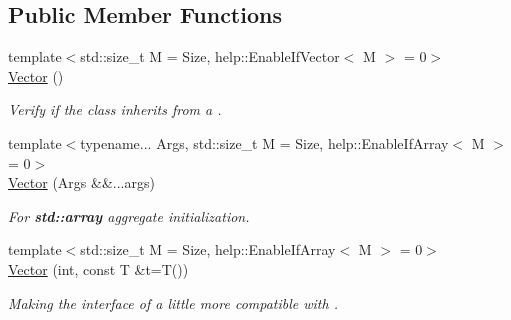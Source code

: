 \subsection*{Public Member Functions}
\begin{DoxyCompactItemize}
\item 
{\footnotesize template$<$std\+::size\+\_\+t M = Size, help\+::\+Enable\+If\+Vector$<$ M $>$  = 0$>$ }\\\hyperlink{structcnt_1_1Vector_aff96e6f41a0a86337921fdf3defd6c3b}{Vector} ()
\begin{DoxyCompactList}\small\item\em Verify if the class inherits from a \textquotesingle{}. \end{DoxyCompactList}\item 
{\footnotesize template$<$typename... Args, std\+::size\+\_\+t M = Size, help\+::\+Enable\+If\+Array$<$ M $>$  = 0$>$ }\\\hyperlink{structcnt_1_1Vector_a614eabb9c163e9eddf77215f2f7bf115}{Vector} (Args \&\&...args)
\begin{DoxyCompactList}\small\item\em For {\bf std\+::array} aggregate initialization. \end{DoxyCompactList}\item 
{\footnotesize template$<$std\+::size\+\_\+t M = Size, help\+::\+Enable\+If\+Array$<$ M $>$  = 0$>$ }\\\hyperlink{structcnt_1_1Vector_a7975aa9753e8a2d6cc9e8dd160d4ffcf}{Vector} (int, const T \&t=T())
\begin{DoxyCompactList}\small\item\em Making the interface of \textquotesingle{} a little more compatible with \textquotesingle{}. \end{DoxyCompactList}\end{DoxyCompactItemize}
